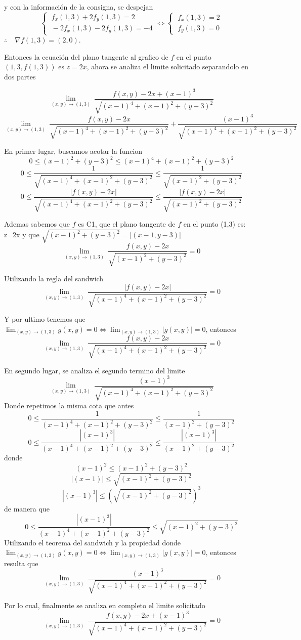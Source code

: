 \begin{solution}
    y con la información de la consigna, se despejan
    \[\begin{cases}
            \;f_x(1,3) + 2f_y(1,3)=2 \\[5pt]
            \;-2f_x(1,3)- 2f_y(1,3)=-4
        \end{cases}
        \iff
        \begin{cases}
            \;f_x(1,3)=2 \\[5pt]
            \;f_y(1,3)=0
        \end{cases}
    \]
    $\therefore\quad\nabla f(1,3)=(2,0)$.

   Entonces la ecuación del plano tangente al grafico de $f$ en el punto $(1,3,f(1,3))$ es $z  = 2x$, ahora se analiza el limite solicitado separandolo en dos partes

    \[
        \lim_{(x,y)\to (1,3)} \ 
        \frac{f(x,y)-2x+(x-1)^3}{\sqrt{(x-1)^4+(x-1)^2+(y-3)^2}}
 \]
        \[
        \lim_{(x,y)\to (1,3)} \ 
        \frac{f(x,y)-2x}{\sqrt{(x-1)^4+(x-1)^2+(y-3)^2}}+ \frac{(x-1)^3}{\sqrt{(x-1)^4+(x-1)^2+(y-3)^2}} 
    \]

En primer lugar, buscamos acotar la funcion
\[
0\le (x-1)^2+(y-3)^2\le (x-1)^4+(x-1)^2+(y-3)^2
\]\[
0\le \frac{1}{\sqrt{(x-1)^4+(x-1)^2+(y-3)^2}} \le \frac{1}{\sqrt{(x-1)^2+(y-3)^2}}
\]
\[
0\le \frac{|f(x,y)-2x|}{\sqrt{(x-1)^4+(x-1)^2+(y-3)^2}} \le \frac{|f(x,y)-2x|}{\sqrt{(x-1)^2+(y-3)^2}}
\]

Ademas sabemos que $f$ es C1, que el plano tangente de $f$ en el punto (1,3) es: z=2x y que $\sqrt{(x-1)^2+(y-3)^2}=|(x-1,y-3)|$
\[
        \lim_{(x,y)\to (1,3)} \ 
        \frac{f(x,y)-2x}{\sqrt{(x-1)^2+(y-3)^2}}=0
 \]

Utilizando la regla del sandwich
\[
        \lim_{(x,y)\to (1,3)} \ 
        \frac{|f(x,y)-2x|}{\sqrt{(x-1)^4+(x-1)^2+(y-3)^2}}=0
 \]

 Y por ultimo tenemos que $  \lim_{(x,y)\to(1,3)} g(x,y)=0 \iff \lim_{(x,y)\to(1,3)} |g(x,y)|=0$, entonces
 \[
        \lim_{(x,y)\to (1,3)} \ 
        \frac{f(x,y)-2x}{\sqrt{(x-1)^4+(x-1)^2+(y-3)^2}}=0
 \]

 En segundo lugar, se analiza el segundo termino del limite
  \[
        \lim_{(x,y)\to (1,3)} \ 
       \frac{(x-1)^3}{\sqrt{(x-1)^4+(x-1)^2+(y-3)^2}} 
    \]
    Donde repetimos la misma cota que antes
    \[
0\le \frac{1}{(x-1)^4+(x-1)^2+(y-3)^2} \le \frac{1}{(x-1)^2+(y-3)^2}
\]
\[
0\le \frac{|(x-1)^3|}{(x-1)^4+(x-1)^2+(y-3)^2} \le \frac{|(x-1)^3|}{(x-1)^2+(y-3)^2}
\]
donde
\[
(x-1)^2\le(x-1)^2+(y-3)^2
\]
\[
|(x-1)|\le \sqrt{(x-1)^2+(y-3)^2}
\]
\[
|(x-1)^3|\le (\sqrt{(x-1)^2+(y-3)^2})^3
\]
de manera que
\[
0\le \frac{|(x-1)^3|}{(x-1)^4+(x-1)^2+(y-3)^2} \le \sqrt{(x-1)^2+(y-3)^2}
\]
 Utilizando el teorema del sandwich y la propiedad donde $  \lim_{(x,y)\to(1,3)} g(x,y)=0 \iff \lim_{(x,y)\to(1,3)} |g(x,y)|=0$, entonces resulta que
 \[
        \lim_{(x,y)\to (1,3)} \ 
       \frac{(x-1)^3}{\sqrt{(x-1)^4+(x-1)^2+(y-3)^2}} =0
    \]

Por lo cual, finalmente se analiza en completo el limite solicitado
 \[
        \lim_{(x,y)\to (1,3)} \ 
        \frac{f(x,y)-2x+(x-1)^3}{\sqrt{(x-1)^4+(x-1)^2+(y-3)^2}} =0      
    \]
\end{solution}
